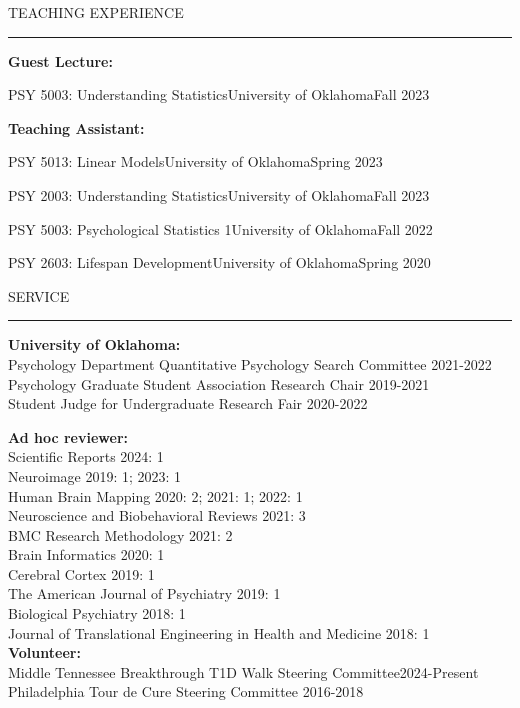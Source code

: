 \documentclass{resume} %
\renewenvironment{rSection}[1]{
\sectionskip
\textcolor{CarnegieMellonRed}{\MakeUppercase{#1}}
\sectionlineskip
\hrule
\begin{list}{}{
\setlength{\leftmargin}{1.5em}
}
\item[]
}{
\end{list}
}
\begin{document}
\begin{rSection}{Teaching Experience}
\bf{Guest Lecture:}\\
\begin{rSubsectionTeach}{PSY 5003: Understanding Statistics}{University of Oklahoma}{Fall 2023}
\end{rSubsectionTeach}

\bf{Teaching Assistant:}\\
\begin{rSubsectionTeach}{PSY 5013: Linear Models}{University of Oklahoma}{Spring 2023}
\end{rSubsectionTeach}
\begin{rSubsectionTeach}{PSY 2003: Understanding Statistics}{University of Oklahoma}{Fall 2023}
\end{rSubsectionTeach}
\begin{rSubsectionTeach}{PSY 5003: Psychological Statistics 1}{University of Oklahoma}{Fall 2022}
\end{rSubsectionTeach}
\begin{rSubsectionTeach}{PSY 2603: Lifespan Development}{University of Oklahoma}{Spring 2020}
\end{rSubsectionTeach}
    
\end{rSection}

\begin{rSection}{Service}
\textbf{University of Oklahoma:} \\
Psychology Department Quantitative Psychology Search Committee \hfill2021-2022 \\
Psychology Graduate Student Association Research Chair \hfill2019-2021 \\
Student Judge for Undergraduate Research Fair \hfill2020-2022

\textbf{Ad hoc reviewer:}\\
Scientific Reports \hfill2024: 1 \\
Neuroimage \hfill2019: 1; 2023: 1 \\
Human Brain Mapping \hfill2020: 2; 2021: 1; 2022: 1 \\
Neuroscience and Biobehavioral Reviews \hfill2021: 3 \\
BMC Research Methodology \hfill2021: 2 \\
Brain Informatics \hfill2020: 1 \\
Cerebral Cortex \hfill2019: 1 \\
The American Journal of Psychiatry \hfill2019: 1 \\
Biological Psychiatry \hfill2018: 1 \\
Journal of Translational Engineering in Health and Medicine \hfill2018: 1 \\

\textbf{Volunteer:}\\
Middle Tennessee Breakthrough T1D Walk Steering Committee\hfill 2024-Present\\
Philadelphia Tour de Cure Steering Committee \hfill2016-2018
\end{rSection}
\end{document}
